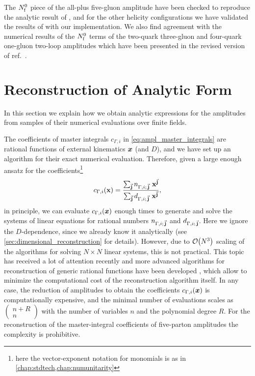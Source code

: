 The $N_\mathrm{f}^0$ piece of the all-plus five-gluon amplitude have been
checked to reproduce the analytic result
of \cite{Gehrmann:2015bfy}, and for the other helicity 
configurations we have validated the results of
\cite{Badger:2017jhb} with our implementation.
We also find agreement with the numerical results of the $N_\mathrm{f}^0$ terms
of the two-quark three-gluon and four-quark one-gluon two-loop
amplitudes which have been presented in the revised version of
ref.~\cite{Badger:2018gip}.


\section{Reconstruction of Analytic Form}
\label{sec:AnalyticForm}
In this section we explain how we obtain analytic expressions for the amplitudes from samples of their numerical evaluations over finite fields.

The coefficients of master integrals $c_{\Gamma,i}$ in \cref{eq:ampl_master_integrals} are rational
functions of external kinematics $\vb*{x}$ (and $D$), 
and we have set up an algorithm for their exact numerical evaluation.
Therefore, given a large enough ansatz for the coefficients\footnote{
  here the vector-exponent notation for monomials is as in \cref{chap:stdtech,chap:numunitarity}
}
\begin{equation}
  c_{\Gamma,i}(\mathbf{x}) = \frac{\sum_{\va{j}} n_{\Gamma,i;\,\va{j}}~\mathbf{x}^{\va{j}}}{\sum_{\va{j}}d_{\Gamma,i;\,\va{j}} ~ \mathbf{x}^{\va{j}}},
\end{equation}
in principle, we can evaluate $c_{\Gamma,i}(\vb*{x})$ enough times to generate and solve the systems of linear equations
for rational numbers $n_{\Gamma,i;\,\va{j}}$ and  $d_{\Gamma,i;\,\va{j}}$. Here we ignore the $D$-dependence, since
we already know it analytically (see \cref{sec:dimensional_reconstruction} for details).
However, due to $\order{N^3} $ scaling of the algorithms for solving $N\times N$ linear systems, this is not practical.
This topic has received a lot of attention recently and more advanced 
algorithms for reconstruction of generic rational functions have been developed \cite{Peraro:2019svx,Peraro:2016wsq,Klappert:2019emp},
which allow to minimize the computational cost of the reconstruction algorithm itself.
In any case, the reduction of amplitudes to obtain the coefficients $c_{\Gamma,i}(\vb*{x})$ is computationally expensive,
and the minimal number of evaluations scales as $\left(\substack{n+R \\ n }\right)$ with the number of variables $n$ and the
polynomial degree $R$.
For the reconstruction of the master-integral coefficients of five-parton amplitudes the complexity is prohibitive.



